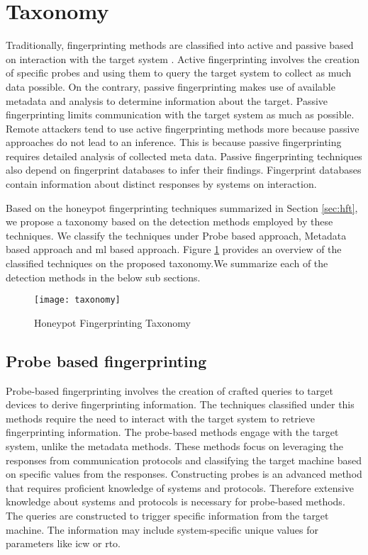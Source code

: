 \section{Taxonomy}
\label{sec:taxonomy}

Traditionally, fingerprinting methods are classified into active and passive based on interaction with the target system \cite{spitzner}. Active fingerprinting involves the creation of specific probes and using them to query the target system to collect as much data possible. On the contrary, passive fingerprinting makes use of available metadata and analysis to determine information about the target. Passive fingerprinting limits communication with the target system as much as possible. Remote attackers tend to use active fingerprinting methods more because passive approaches do not lead to an inference. This is because passive fingerprinting requires detailed analysis of collected meta data. Passive fingerprinting techniques also depend on fingerprint databases to infer their findings. Fingerprint databases contain information about distinct responses by systems on interaction.
   
Based on the honeypot fingerprinting techniques summarized in Section \ref{sec:hft}, we propose a taxonomy based on the detection methods employed by these techniques. We classify the techniques under Probe based approach, Metadata based approach and \acrlong{ml} based approach. Figure \ref{fig:taxonomy} provides an overview of the classified techniques on the proposed taxonomy.We summarize each of the detection methods in the below sub sections. 

\begin{figure}[t]
    \centering
    \texttt{[image: taxonomy]}
    \caption{Honeypot Fingerprinting Taxonomy}
    \label{fig:taxonomy}
\end{figure}

\subsection{Probe based fingerprinting}
\label{Probe Based}
Probe-based fingerprinting involves the creation of crafted queries to target devices to derive fingerprinting information. The techniques classified under this methods require the need to interact with the target system to retrieve fingerprinting information. The probe-based methods engage with the target system, unlike the metadata methods. These methods focus on leveraging the responses from communication protocols and classifying the target machine based on specific values from the responses. Constructing probes is an advanced method that requires proficient knowledge of systems and protocols. Therefore extensive knowledge about systems and protocols is necessary for probe-based methods. The queries are constructed to trigger specific information from the target machine. The information may include system-specific unique values for parameters like \acrfull{icw} or \acrfull{rto}. 

